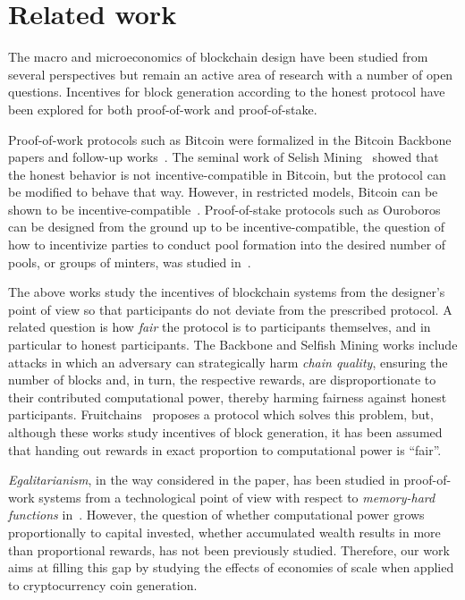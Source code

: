 \section{Related work}\label{sec:related}
The macro and microeconomics of blockchain design have been studied from
several perspectives but remain an active area of research with a number of open questions.
Incentives for block generation
according to the honest protocol have been explored for both proof-of-work and
proof-of-stake.

Proof-of-work protocols such as Bitcoin were formalized in the Bitcoin
Backbone~\cite{EC:GarKiaLeo15,C:GarKiaLeo17} papers and follow-up
works~\cite{pass2017analysis}. The seminal work of Selish
Mining~\cite{FC:EyaSir14,FC:SapSomZoh16} showed that the honest behavior is not
incentive-compatible in Bitcoin, but the protocol can be modified to behave
that way. However, in restricted models, Bitcoin can be shown to be incentive-compatible~\cite{kiayias2016blockchain}.  Proof-of-stake protocols such as
Ouroboros~\cite{C:KRDO17} can be designed from the ground up to be
incentive-compatible, \eg the question of how to incentivize parties to conduct
pool formation into the desired number of pools, or groups of minters, was
studied in~\cite{bkks2018}.

The above works study the incentives of blockchain systems from the designer's
point of view so that participants do not deviate from the prescribed protocol.
A related question is how \emph{fair} the protocol is to participants
themselves, and in particular to honest participants. The Backbone and Selfish
Mining works include attacks in which an adversary can strategically harm
\emph{chain quality}, ensuring the number of blocks and, in turn, the respective
rewards, are disproportionate to their contributed computational power, thereby
harming fairness against honest participants. Fruitchains~\cite{PODC:PasShi17}
proposes a protocol which solves this problem, but, although
these works study incentives of block generation, it has been
assumed that handing out rewards in exact proportion to computational power is
``fair''.

\emph{Egalitarianism}, in the way considered in the paper, has been studied in
proof-of-work systems from a technological point of view with respect to
\emph{memory-hard functions} in~\cite{alwen2017depth,biryukov2016egalitarian}.  However, the question
of whether computational power grows proportionally to capital invested, \ie
whether accumulated wealth results in more than proportional rewards, has not
been previously studied. Therefore, our work aims at filling this gap by
studying the effects of economies of scale when applied to cryptocurrency coin
generation.

